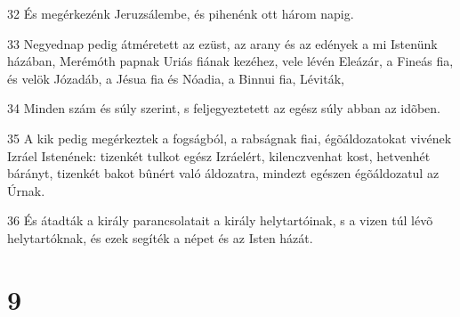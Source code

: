 {\par 32 És megérkezénk Jeruzsálembe, és pihenénk ott három napig.
\par 33 Negyednap pedig átméretett az ezüst, az arany és az edények a mi Istenünk házában, Merémóth papnak Uriás fiának kezéhez, vele lévén Eleázár, a Fineás fia, és velök Józadáb, a Jésua fia és Nóadia, a Binnui fia, Léviták,
\par 34 Minden szám és súly szerint, s feljegyeztetett az egész súly abban az idõben.
\par 35 A kik pedig megérkeztek a fogságból, a rabságnak fiai, égõáldozatokat vivének Izráel Istenének: tizenkét tulkot egész Izráelért, kilenczvenhat kost, hetvenhét bárányt, tizenkét bakot bûnért való áldozatra, mindezt egészen égõáldozatul az Úrnak.
\par 36 És átadták a király parancsolatait a király helytartóinak, s a vizen túl lévõ helytartóknak, és ezek segíték a népet és az Isten házát.

\chapter{9}

}
